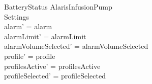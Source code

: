 \begin{schema}{BatteryStatus}
	\Delta AlarisInfusionPump\\
	Settings\\
	\where
	alarm' = alarm\\
	alarmLimit' = alarmLimit\\
	alarmVolumeSelected' = alarmVolumeSelected\\
	profile' = profile\\
	profilesActive' = profilesActive\\  
	  profileSelected' = profileSelected\\
	

\end{schema}
